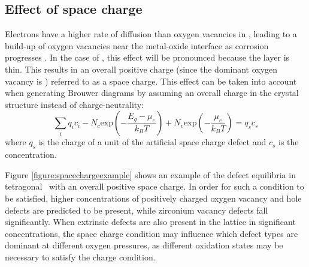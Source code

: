 \subsection{Effect of space charge} \label{space_charge}

Electrons have a higher rate of diffusion than oxygen vacancies in \zirconia , leading to a build-up of oxygen vacancies near the metal-oxide interface as corrosion progresses \cite{bojinov2010influence}. In the case of \zirconia , this effect will be pronounced because the layer is thin. This results in an overall positive charge (since the dominant oxygen vacancy is ) referred to as a space charge. This effect can be taken into account when generating Brouwer diagrams by assuming an overall charge in the crystal structure instead of charge-neutrality:
\begin{equation}
\sum_{i}q_{i}c_{i} - N_{c}\textrm{exp}{(-\frac{E_{g}-\mu_{e}}{k_{B}T})} + N_{v}\textrm{exp}{(-\frac{\mu_{e}}{k_{B}T})} = q_{s}c_{s}
\label{charge_non_neutrality}
\end{equation}
where $q_{s}$ is the charge of a unit of the artificial space charge defect and $c_{s}$ is the concentration.

Figure \ref{figure:spacechargeexample} shows an example of the defect equilibria in tetragonal \zirconia\ with an overall positive space charge. In order for such a condition to be satisfied, higher concentrations of positively charged oxygen vacancy and hole defects are predicted to be present, while zirconium vacancy defects fall significantly. When extrinsic defects are also present in the lattice in significant concentrations, the space charge condition may influence which defect types are dominant at different oxygen pressures, as different oxidation states may be necessary to satisfy the charge condition.


